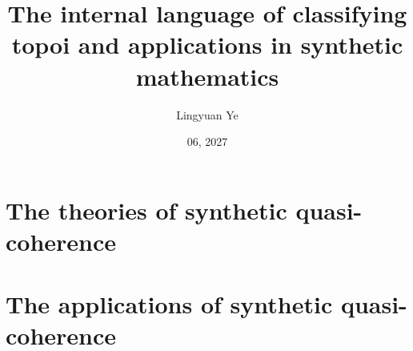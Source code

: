 \documentclass[withindex,glossary,times]{cam-thesis}
\title{The internal language of classifying topoi and applications in synthetic mathematics}
\author{Lingyuan Ye}
\date{06, 2027}
\theoremstyle{definition}
\begin{document}
\frontmatter{}

\setcounter{page}{1}


% 
\part{The theories of synthetic quasi-coherence}\label{prt:theory}




\part{The applications of synthetic quasi-coherence}\label{prt:appl}




%

\renewcommand{\bibname}{References}
\cleardoublepage
{}
{}



\appendix



\printthesisindex
\end{document}
